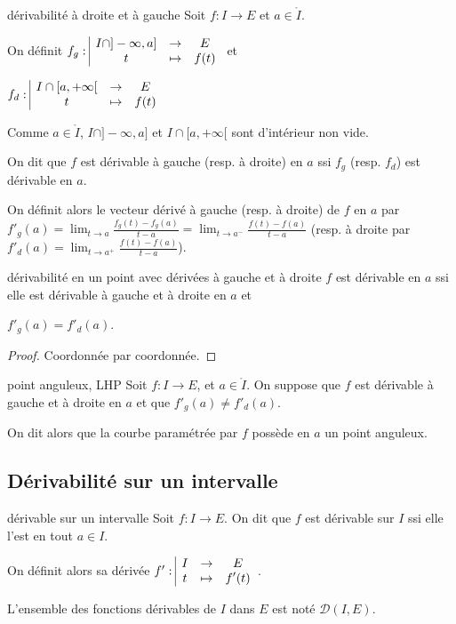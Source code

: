 \begin{definition}{dérivabilité à droite et à gauche}{}
    Soit $f : I \to E$ et $a \in \mathring I$. 

    \avspace On définit $f_g: \space \begin{array}{|ccc} \displaystyle I \cap ]-\infty, a] & \to & \displaystyle E \\ \displaystyle t & \mapsto & \displaystyle f(t) \end{array}$ et 

    \avspace $f_d: \space \begin{array}{|ccc} \displaystyle I \cap [a, +\infty[ & \to & \displaystyle E \\ \displaystyle t & \mapsto & \displaystyle f(t) \end{array}$

    Comme $a \in \mathring I$, $I \cap ]-\infty, a]$ et $I \cap [a, +\infty[$ 
    sont d'intérieur non vide.

    On dit que $f$ est dérivable à gauche (resp. à droite) en $a$ ssi $f_g$ 
    (resp. $f_d$) est dérivable en $a$.

    On définit alors le vecteur dérivé à gauche (resp. à droite) de $f$ en $a$ par 
    $\displaystyle f'_g(a) = \lim_{t \to a} \frac{f_g(t) - f_g(a)}{t-a} = \lim_{t \to a^-} \frac{f(t) - f(a)}{t-a}$
    (resp. à droite par $\displaystyle f'_d(a) = \lim_{t \to a^+} \frac{f(t) - f(a)}{t-a}$).                                                    
\end{definition}

\begin{proposition}{dérivabilité en un point avec dérivées à gauche et à droite}{}
    $f$ est dérivable en $a$ ssi elle est dérivable à gauche et à droite en $a$ et
    
    $f'_g(a) = f'_d(a)$. 
\end{proposition}

\begin{proof}
    Coordonnée par coordonnée.
\end{proof}

\begin{definition}{point anguleux, LHP}{}
    Soit $f : I \to E$, et $a \in \mathring{I }$. 
    On suppose que $f$ est dérivable à gauche et à droite en $a$ et que 
    $f'_g(a) \neq f'_d(a)$.

    On dit alors que la courbe paramétrée par $f$ possède en $a$ un point anguleux.
\end{definition}

\subsection{Dérivabilité sur un intervalle}

\begin{definition}{dérivable sur un intervalle}{}
    Soit $f : I \to E$. On dit que $f$ est dérivable sur $I$ ssi elle l'est en tout $a \in I$. 

    On définit alors sa dérivée $f': \space \begin{array}{|ccc} \displaystyle I & \to & \displaystyle E \\ \displaystyle t & \mapsto & \displaystyle f'(t) \end{array}$. 

    L'ensemble des fonctions dérivables de $I$ dans $E$ est noté $\mathscr D(I, E)$.
\end{definition}

